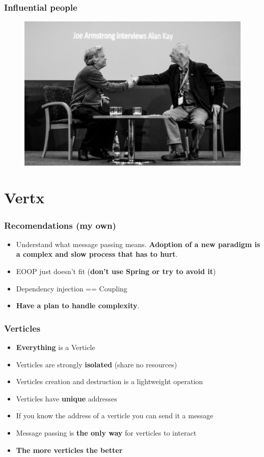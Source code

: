\documentclass{beamer}
\begin{document}
\begin{frame}
\frametitle{Influential people}
\begin{figure}
\includegraphics[scale=0.25]{images/joe_and_alan.jpg}
\end{figure}
\end{frame} 

\section{Vertx}

\begin{frame}
\frametitle{Recomendations (my own)}
\begin{itemize}
\item<1-> Understand what message passing means. \textbf{Adoption of a new paradigm is a complex and slow process that has to hurt}.
\item<2-> EOOP just doesn't fit (\textbf{don't use Spring or try to avoid it})
\item <3->Dependency injection == Coupling
\item<4-> \textbf{Have a plan to handle complexity}.
\end{itemize}
\end{frame} 


\begin{frame}
\frametitle{Verticles}
\begin{itemize}
 \item<1-> \textbf{Everything} is a Verticle
 \item<2-> Verticles are strongly \textbf{isolated} (share no resources)
 \item<3-> Verticles creation and destruction is a lightweight operation
 \item<4-> Verticles have \textbf{unique} addresses
 \item<5-> If you know the address  of a verticle you can send it a message
 \item<6-> Message passing is \textbf{the only way} for verticles to interact
 \item<7-> \textbf{The more verticles the better}
\end{itemize}
\end{frame}
\end{document}
